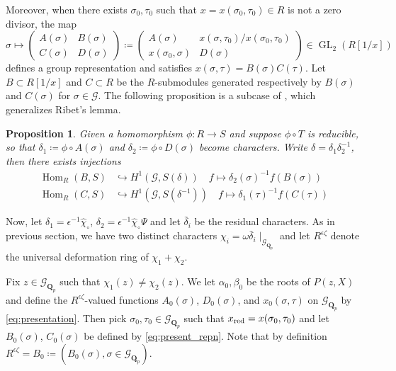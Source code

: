 \documentclass[leqno]{amsart}
\newtheorem{prop}[thm]{Proposition}
\theoremstyle{definition}
\theoremstyle{remark}
\newcommand{\Qp}{\mathbf{Q}_p}
\DeclareMathOperator{\Hom}{Hom}
\DeclareMathOperator{\GL}{GL}
\newcommand{\Gp}{\mathcal{G}_{\Qp}} %
\newcommand{\xx}{x_\textnormal{red}}
\begin{document}
Moreover, when there exists $\sigma_0,\tau_0$ such that
$x=x(\sigma_0,\tau_0)\in R$ is not a zero divisor, the map
\begin{equation}\label{eq:present_repn}
    \sigma\mapsto 
    \begin{pmatrix}
        A(\sigma)& B(\sigma)\\
        C(\sigma) & D(\sigma)
    \end{pmatrix}\coloneqq
    \begin{pmatrix}
        A(\sigma)& x(\sigma,\tau_0)/x(\sigma_0,\tau_0)\\
        x(\sigma_0,\sigma) & D(\sigma)
    \end{pmatrix}
        \in \GL_2(R[1/x])
\end{equation}
defines a group representation 
and satisfies $x(\sigma,\tau)=B(\sigma)C(\tau)$.
Let $B\subset R[1/x]$ and $C\subset R$
be the $R$-submodules generated respectively by
$B(\sigma)$ and $C(\sigma)$ for $\sigma\in\mathcal{G}$.
The following proposition is a subcase of 
\cite[Thm 1.5.5]{BC}, which generalizes Ribet's lemma.
\begin{prop}\label{prop:BC}
Given a homomorphism $\phi\colon R\to S$ and suppose 
$\phi\circ T$ is reducible, so that 
$\delta_1\coloneqq \phi\circ A(\sigma)$ and 
$\delta_2\coloneqq \phi\circ D(\sigma)$ become characters.
Write $\delta=\delta_1\delta_2^{-1}$, then
there exists injections 
\begin{align*}
    \Hom_R(B,S)&\hookrightarrow H^1(\mathcal{G},S(\delta))\quad
    f\mapsto \delta_2(\sigma)^{-1}f(B(\sigma))\\
    \Hom_R(C,S)&\hookrightarrow H^1(\mathcal{G},S(\delta^{-1}))\quad
    f\mapsto \delta_1(\tau)^{-1}f(C(\tau))
\end{align*}
\end{prop}

Now, let $\delta_1=\epsilon^{-1}\hat{\chi}_\circ$,
$\delta_2=\epsilon^{-1}\hat{\chi}_\circ\Psi$ 
and let $\bar{\delta}_i$ be the residual characters.
As in previous section, we have two distinct characters
$\chi_i=\omega\bar{\delta}_i\mid_{\Gp}$ and let 
$R^{\epsilon\zeta}$ denote the universal deformation ring
of $\chi_1+\chi_2$.

Fix $z\in\Gp$ such that $\chi_1(z)\neq \chi_2(z)$.
We let $\alpha_0,\beta_0$ be the roots of $P(z,X)$
and define the $ R^{\epsilon\zeta}$-valued functions
$A_0(\sigma)$, $D_0(\sigma)$, and $x_0(\sigma,\tau)$
on $\Gp$ by \eqref{eq:presentation}.
Then pick $\sigma_0,\tau_0\in\Gp$ such that
$\xx=x(\sigma_0,\tau_0)$
and let $B_0(\sigma)$, $C_0(\sigma)$ be defined
by \eqref{eq:present_repn}.
Note that by definition 
$R^{\epsilon\zeta}=B_0\coloneqq(B_0(\sigma), \sigma\in\Gp)$.
\end{document}
